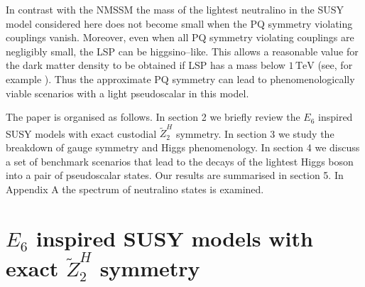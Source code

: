 \documentclass[12pt,a4paper]{article}
\begin{document}
In contrast with the NMSSM the mass of the lightest neutralino in the
SUSY model considered here does not become small when the PQ symmetry
violating couplings vanish. Moreover, even when all PQ symmetry
violating couplings are negligibly small, the LSP can be
higgsino--like. This allows a reasonable value for the dark matter
density to be obtained if LSP has a mass below $1\,\mbox{TeV}$ (see,
for example \cite{ArkaniHamed:2006mb}). Thus the approximate PQ
symmetry can lead to phenomenologically viable scenarios with a light
pseudoscalar in this model.

The paper is organised as follows. In section 2 we briefly review the $E_6$ inspired
SUSY models with exact
custodial $\tilde{Z}^{H}_2$ symmetry. In section 3 we study
the breakdown of gauge symmetry and Higgs phenomenology.
In section 4 we discuss a set of benchmark scenarios that lead to the 
decays of the lightest Higgs boson
into a pair of pseudoscalar states. Our results are summarised in section 5.
In Appendix A the spectrum of neutralino
states is examined.



\section{$E_6$ inspired SUSY models with exact $\tilde{Z}^{H}_2$ symmetry}
\end{document}
